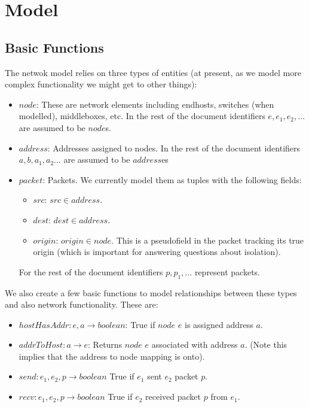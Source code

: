 \section{Model}
\subsection{Basic Functions}
The netwok model relies on three types of entities (at present, as we model more complex functionality we might get to
other things):

\begin{itemize}
\item $node$: These are network elements including endhosts, switches (when modelled), middleboxes, etc. In the rest of
the document identifiers $e, e_1, e_2, \ldots$ are assumed to be $node$s.
\item $address$: Addresses assigned to nodes. In the rest of the document identifiers $a, b, a_1, a_2\ldots$ are assumed
to be $address$es
\item $packet$: Packets. We currently model them as tuples with the following fields:
\begin{itemize}
\item $src$: $src\in address$.
\item $dest$: $dest\in address$.
\item $origin$: $origin\in node$. This is a pseudofield in the packet tracking its true origin (which is important for
answering questions about isolation).
\end{itemize}
For the rest of the document identifiers $p, p_1,\ldots$ represent packets.
\end{itemize}

We also create a few basic functions to model relationships between these types and also network functionality. These
are:
\begin{itemize}
\item $hostHasAddr: e, a \rightarrow boolean$: True if $node$ $e$ is assigned address $a$.
\item $addrToHost: a \rightarrow e$: Returns $node$ $e$ associated with address $a$. (Note this implies that the address
to node mapping is onto).
\item $send: e_1, e_2, p \rightarrow boolean$ True if $e_1$ sent $e_2$ packet $p$.
\item $recv: e_1, e_2, p \rightarrow boolean$ True if $e_2$ received packet $p$ from $e_1$.
\end{itemize}

